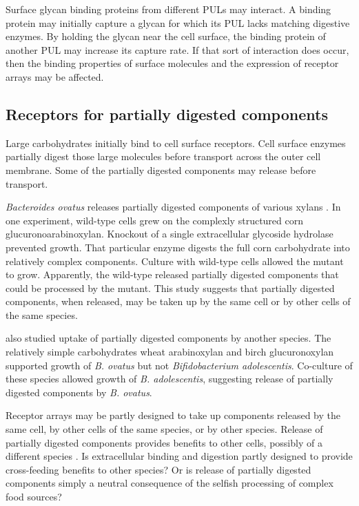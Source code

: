 \documentclass[\mydocfontsize]{article}
\begin{document}
\begin{multicols}{2}
Surface glycan binding proteins from different PULs may interact. A binding protein may initially capture a glycan for which its PUL lacks matching digestive enzymes. By holding the glycan near the cell surface, the binding protein of another PUL may increase its capture rate. If that sort of interaction does occur, then the binding properties of surface molecules and the expression of receptor arrays may be affected.

\subsection{Receptors for partially digested components}

Large carbohydrates initially bind to cell surface receptors. Cell surface enzymes partially digest those large molecules before transport across the outer cell membrane. Some of the partially digested components may release before transport. 

\textit{Bacteroides ovatus} releases partially digested components of various xylans \autocite{rogowski15glycan}. In one experiment, wild-type cells grew on the complexly structured corn glucuronoarabinoxylan. Knockout of a single extracellular glycoside hydrolase prevented growth. That particular enzyme digests the full corn carbohydrate into relatively complex components. Culture with wild-type cells allowed the mutant to grow. Apparently, the wild-type released partially digested components that could be processed by the mutant. This study suggests that partially digested components, when released, may be taken up by the same cell or by other cells of the same species. 

\textcite{rogowski15glycan} also studied uptake of partially digested components by another species. The relatively simple carbohydrates wheat arabinoxylan and birch glucuronoxylan supported growth of \textit{B. ovatus} but not \textit{Bifidobacterium adolescentis}. Co-culture of these species allowed growth of \textit{B. adolescentis}, suggesting release of partially digested components by \textit{B. ovatus}. 

Receptor arrays may be partly designed to take up components released by the same cell, by other cells of the same species, or by other species. Release of partially digested components provides benefits to other cells, possibly of a different species \autocite{pande17bacterial}. Is extracellular binding and digestion partly designed to provide cross-feeding benefits to other species? Or is release of partially digested components simply a neutral consequence of the selfish processing of complex food sources?


\end{multicols}
\end{document}
